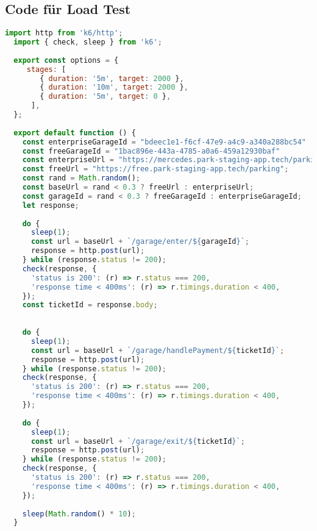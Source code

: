 \subsection{Code für Load Test}
\label{app:load-test-code}

\begin{lstlisting}[language=JavaScript, caption={Load Test Code}, captionpos=b, label={lst:load-test}]
  import http from 'k6/http';
  import { check, sleep } from 'k6';
  
  export const options = {
     stages: [
        { duration: '5m', target: 2000 },
        { duration: '10m', target: 2000 },
        { duration: '5m', target: 0 },
      ],
  };
  
  export default function () {
    const enterpriseGarageId = "bdeec1e1-f6cf-47e9-a4c9-a340a288bc54"
    const freeGarageId = "1bac896e-443a-4785-a0a6-459a12930baf"
    const enterpriseUrl = "https://mercedes.park-staging-app.tech/parking";
    const freeUrl = "https://free.park-staging-app.tech/parking";
    const rand = Math.random();
    const baseUrl = rand < 0.3 ? freeUrl : enterpriseUrl;
    const garageId = rand < 0.3 ? freeGarageId : enterpriseGarageId;
    let response;
  
    do {
      sleep(1);
      const url = baseUrl + `/garage/enter/${garageId}`;
      response = http.post(url);
    } while (response.status != 200);
    check(response, {
      'status is 200': (r) => r.status === 200,
      'response time < 400ms': (r) => r.timings.duration < 400,
    });
    const ticketId = response.body;
  
  
    do {
      sleep(1);
      const url = baseUrl + `/garage/handlePayment/${ticketId}`;
      response = http.post(url);
    } while (response.status != 200);
    check(response, {
      'status is 200': (r) => r.status === 200,
      'response time < 400ms': (r) => r.timings.duration < 400,
    });
  
    do {
      sleep(1);
      const url = baseUrl + `/garage/exit/${ticketId}`;
      response = http.post(url);
    } while (response.status != 200);
    check(response, {
      'status is 200': (r) => r.status === 200,
      'response time < 400ms': (r) => r.timings.duration < 400,
    });
    
    sleep(Math.random() * 10);
  }
\end{lstlisting}